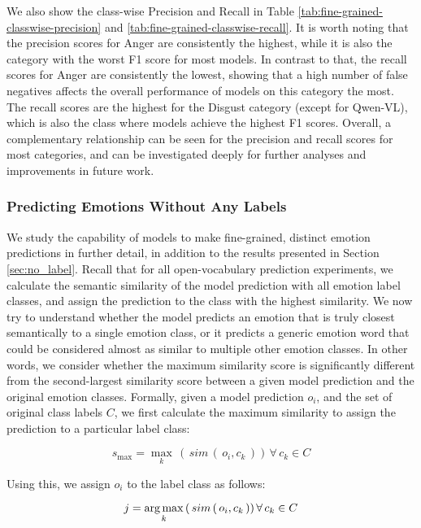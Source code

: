 We also show the class-wise Precision and Recall in Table \ref{tab:fine-grained-classwise-precision} and \ref{tab:fine-grained-classwise-recall}. It is worth noting that the precision scores for Anger are consistently the highest, while it is also the category with the worst F1 score for most models. In contrast to that, the recall scores for Anger are consistently the lowest, showing that a high number of false negatives affects the overall performance of models on this category the most. The recall scores are the highest for the Disgust category (except for Qwen-VL), which is also the class where models achieve the highest F1 scores. Overall, a complementary relationship can be seen for the precision and recall scores for most categories, and can be investigated deeply for further analyses and improvements in future work.

\subsubsection{Predicting Emotions Without Any Labels}
\label{app:no_label}

We study the capability of models to make fine-grained, distinct emotion predictions in further detail, in addition to the results presented in Section \ref{sec:no_label}. Recall that for all open-vocabulary prediction experiments, we calculate the semantic similarity of the model prediction with all emotion label classes, and assign the prediction to the class with the highest similarity. We now try to understand whether the model predicts an emotion that is truly closest semantically to a single emotion class, or it predicts a generic emotion word that could be considered almost as similar to multiple other emotion classes. In other words, we consider whether the maximum similarity score is significantly different from the second-largest similarity score between a given model prediction and the original emotion classes. Formally, given a model prediction \(o_i\), and the set of original class labels \(C\), we first calculate the maximum similarity to assign the prediction to a particular label class: 

\begin{equation}
\label{eq:maximum_similarity}
s_{\text{max}} = \max_{k}\, (\,sim\,(\,o_i, c_k\,))\, \forall\, c_k \in C
\end{equation}

Using this, we assign \(o_i\) to the label class as follows:

\begin{equation}
\label{eq:maximum_similarity_class}
j = \operatorname*{arg\,max}_k\, (\,sim\,(\,o_i, c_k\,))\, \forall\, c_k \in C   
\end{equation}

